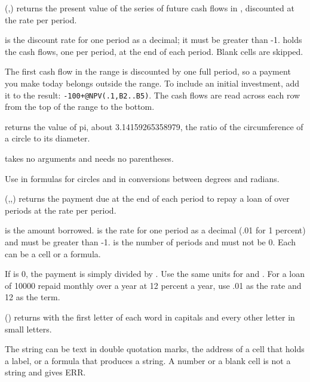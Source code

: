 (,) returns the present value of the series of future cash flows in , discounted at the rate  per period.

 is the discount rate for one period as a decimal; it must be greater than -1.  holds the cash flows, one per period, at the end of each period. Blank cells are skipped.

The first cash flow in the range is discounted by one full period, so a payment you make today belongs outside the range. To include an initial investment, add it to the result: \texttt{-100+@NPV(.1,B2..B5)}. The cash flows are read across each row from the top of the range to the bottom.

\Examples
{}

 returns the value of pi, about 3.14159265358979, the ratio of the circumference of a circle to its diameter.

 takes no arguments and needs no parentheses.

Use  in formulas for circles and in conversions between degrees and radians.

\Examples
{}

(,,) returns the payment due at the end of each period to repay a loan of  over  periods at the rate  per period.

 is the amount borrowed.  is the rate for one period as a decimal (.01 for 1 percent) and must be greater than -1.  is the number of periods and must not be 0. Each can be a cell or a formula.

If  is 0, the payment is simply  divided by . Use the same units for  and . For a loan of 10000 repaid monthly over a year at 12 percent a year, use .01 as the rate and 12 as the term.

\Examples
{}

() returns  with the first letter of each word in capitals and every other letter in small letters.

The string can be text in double quotation marks, the address of a cell that holds a label, or a formula that produces a string. A number or a blank cell is not a string and gives ERR.

